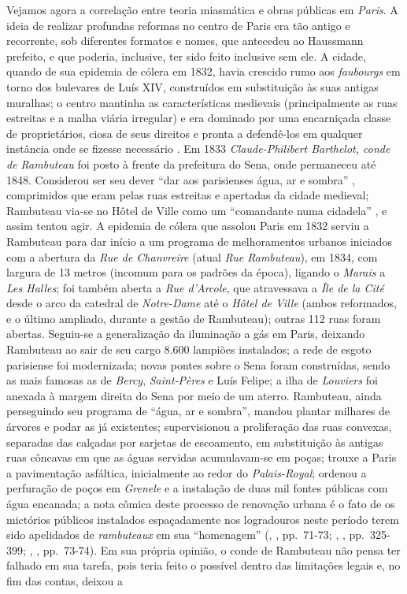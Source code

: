 Vejamos agora a correlação entre teoria miasmática e obras públicas em \textit{Paris}. A ideia de realizar profundas reformas no centro de Paris era tão antigo e recorrente, sob diferentes formatos e nomes, que antecedeu ao Haussmann prefeito, e que poderia, inclusive, ter sido feito inclusive sem ele. A cidade, quando de sua epidemia de cólera em 1832, havia crescido rumo aos \textit{faubourgs} em torno dos bulevares de Luís XIV, construídos em substituição às suas antigas muralhas; o centro mantinha as características medievais (principalmente as ruas estreitas e a malha viária irregular) e era dominado por uma encarniçada classe de proprietários, ciosa de seus direitos e pronta a defendê-los em qualquer instância onde se fizesse necessário \cite{faure_paris_2004}. Em 1833 \textit{Claude-Philibert Barthelot, conde de Rambuteau} foi posto à frente da prefeitura do Sena, onde permaneceu até 1848. Considerou ser seu dever ``dar aos parisienses água, ar e sombra'' \cite[p.~269]{rambuteau1905memoires}, comprimidos que eram pelas ruas estreitas e apertadas da cidade medieval; Rambuteau via-se no Hôtel de Ville como um ``comandante numa cidadela'' \cite[p.~269]{rambuteau1905memoires}, e assim tentou agir. A epidemia de cólera que assolou Paris em 1832 serviu a Rambuteau para dar início a um programa de melhoramentos urbanos iniciados com a abertura da \textit{Rue de Chanvreire} (atual \textit{Rue Rambuteau}), em 1834, com largura de 13 metros (incomum para os padrões da época), ligando o \textit{Marais} a \textit{Les Halles}; foi também aberta a \textit{Rue d'Arcole}, que atravessava a \textit{Île de la Cité} desde o arco da catedral de \textit{Notre-Dame} até o \textit{Hôtel de Ville} (ambos reformados, e o último ampliado, durante a gestão de Rambuteau); outras 112 ruas foram abertas. Seguiu-se a generalização da iluminação a gás em Paris, deixando Rambuteau ao sair de seu cargo 8.600 lampiões instalados; a rede de esgoto parisiense foi modernizada; novas pontes sobre o Sena foram construídas, sendo as mais famosas as de \textit{Bercy}, \textit{Saint-Pères} e Luís Felipe; a ilha de \textit{Louviers} foi anexada à margem direita do Sena por meio de um aterro. Rambuteau, ainda perseguindo seu programa de ``água, ar e sombra'', mandou plantar milhares de árvores e podar as já existentes; supervisionou a proliferação das ruas convexas, separadas das calçadas por sarjetas de escoamento, em substituição às antigas ruas côncavas em que as águas servidas acumulavam-se em poças; trouxe a Paris a pavimentação asfáltica, inicialmente ao redor do \textit{Palais-Royal}; ordenou a perfuração de poços em \textit{Grenele} e a instalação de duas mil fontes públicas com água encanada; a nota cômica deste processo de renovação urbana é o fato de os mictórios públicos instalados espaçadamente nos logradouros neste período terem sido apelidados de \textit{rambuteaux} em sua ``homenagem'' (\citeauthor{combeau_paris_2011}, \citeyear{combeau_paris_2011}, pp.~71-73; \citeauthor{rambuteau1905memoires}, \citeyear{rambuteau1905memoires}, pp.~325-399; \citeauthor{petti_eurfranba_2011}, \citeyear{petti_eurfranba_2011}, pp.~73-74). Em sua própria opinião, o conde de Rambuteau não pensa ter falhado em sua tarefa, pois teria feito o possível dentro das limitações legais e, no fim das contas, deixou a 